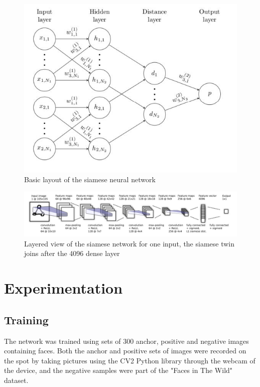 \documentclass[12pt]{article} %
\begin{document}
	\begin{figure}[!htb]
	\includegraphics{siamese_network}
	\caption{Basic layout of the siamese neural network}
	\end{figure}


	\begin{figure}[!htb]
	\includegraphics[scale=0.45]{siamese_network_layers}
	\caption{Layered view of the siamese network for one input, the siamese twin joins after the 4096 dense layer}
	\end{figure}




\section{Experimentation}

\subsection{Training}

	The network was trained using sets of 300 anchor, positive and negative images containing faces.
	Both the anchor and positive sets of images were recorded on the spot by taking pictures using the CV2 Python library through the webcam of the device, and the negative samples were part of the "Faces in The Wild" dataset.
\end{document}
